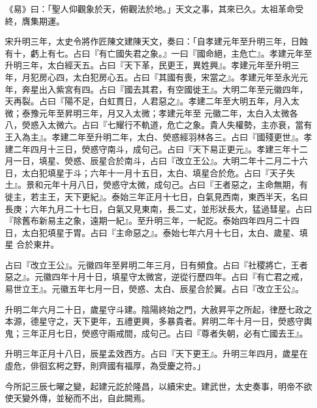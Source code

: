 
\begin{pinyinscope}

 《易》曰：「聖人仰觀象於天，俯觀法於地。」天文之事，其來已久。太祖革命受終，膺集期運。



 宋升明三年，太史令將作匠陳文建陳天文，奏曰：「自孝建元年至升明三年，日蝕有十，虧上有七。占曰『有亡國失君之象。』一曰『國命絕，主危亡』。孝建元年至升明三年，太白經天五。占曰『天下革，民更王，異姓興』。孝建元年至升明三年，月犯房心四，太白犯房心五。占曰『其國有喪，宋當之』。孝建元年至永光元年，奔星出入紫宮有四。占曰『國去其君，有空國徙王』。大明二年至元徽四年，天再裂。占曰『陽不足，白虹貫日，人君惡之』。孝建二年至大明五年，月入太微；泰豫元年至昇明三年，月又入太微；孝建元年至
 元徽二年，太白入太微各八，熒惑入太微六。占曰『七耀行不軌道，危亡之象。貴人失權勢，主亦衰，當有王入為主』。孝建二年至升明二年，太白、熒惑經羽林各三。占曰『國殘更世』。孝建二年四月十三日，熒惑守南斗，成句己。占曰『天下易正更元』。孝建三年十二月一日，填星、熒惑、辰星合於南斗，占曰『改立王公』。大明二年十二月二十六日，太白犯填星于斗；六年十一月十五日，太白、填星合於危。占曰『天子失土』。景和元年十月八日，熒惑守太微，成句己。占曰『王者惡之，主命無期，有徙主，若主王，天下更紀』。泰始三年正月十七日，白氣見西南，東西半天，名曰長庚；六年九月二十七日，白氣又見東南，長二丈，並形狀長大，猛過彗星。占曰『除舊布新易主之象，遠期一紀』。至升明三年，一紀訖。泰始四年四月二十四日，太白犯填星于胃。占曰『主命惡之』。泰始七年六月十七日，太白、歲星、填星
 合於東井。



 占曰『改立王公』。元徽四年至昇明二年三月，日有頻食。占曰『社稷將亡，王者惡之』。元徽四年十月十日，填星守太微宮，逆從行歷四年。占曰『有亡君之戒，易世立王』。元徽五年七月一日，熒惑、太白、辰星合於翼。占曰『改立王公』。



 升明二年六月二十日，歲星守斗建。陰陽終始之門，大赦昇平之所起，律歷七政之本源，德星守之，天下更年，五禮更興，多暴貴者。昇明二年十月一日，熒惑守輿鬼；三年正月七日，熒惑守兩戒間，成句己。占曰『尊者失朝，必有亡國去王』。



 升明三年正月十八日，辰星孟效西方。占曰『天下更王』。升明三年四月，歲星在虛危，俳徊玄枵之野，則齊國有福厚，為受慶之符。」



 今所記三辰七曜之變，起建元訖於隆昌，以續宋史。建武世，太史奏事，明帝不欲使天變外傳，並秘而不出，自此闕焉。




\end{pinyinscope}
